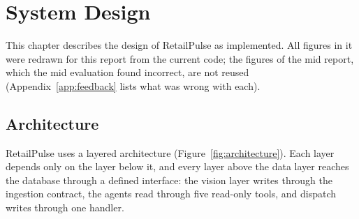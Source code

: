 \chapter{System Design}
\label{ch:design}

This chapter describes the design of RetailPulse as implemented. All figures in it were redrawn for this report from the current code; the figures of the mid report, which the mid evaluation found incorrect, are not reused (Appendix~\ref{app:feedback} lists what was wrong with each).

\section{Architecture}
RetailPulse uses a layered architecture (Figure~\ref{fig:architecture}). Each layer depends only on the layer below it, and every layer above the data layer reaches the database through a defined interface: the vision layer writes through the ingestion contract, the agents read through five read-only tools, and dispatch writes through one handler.

